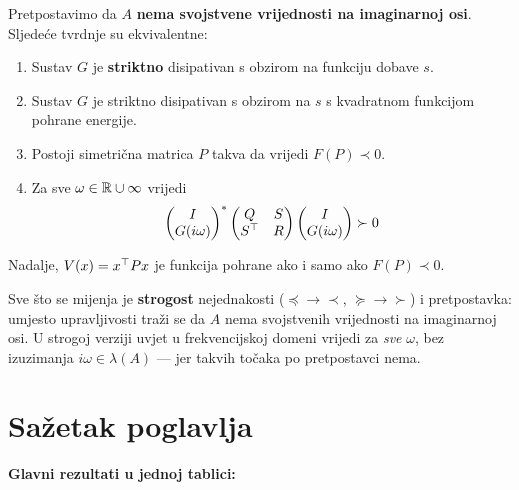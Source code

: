 \begin{teorem}
Pretpostavimo da $A$ \textbf{nema svojstvene vrijednosti na imaginarnoj osi}.
Sljedeće tvrdnje su ekvivalentne:
\begin{enumerate}[label=\roman*)]
  \item Sustav $G$ je \textbf{striktno} disipativan s obzirom na funkciju
        dobave $s$.
  \item Sustav $G$ je striktno disipativan s obzirom na $s$ s kvadratnom
        funkcijom pohrane energije.
  \item Postoji simetrična matrica $P$ takva da vrijedi $F(P) \prec 0$.
  \item Za sve $\omega \in \mathbb{R} \cup \infty$ vrijedi
        \[
        \begin{pmatrix}I\\ G(i\omega)\end{pmatrix}^{*}
        \begin{pmatrix}Q & S\\ S^{\top} & R\end{pmatrix}
        \begin{pmatrix}I\\ G(i\omega)\end{pmatrix} \succ 0
        \]
\end{enumerate}
Nadalje, $V(x) = x^{\top} Px$ je funkcija pohrane ako i samo ako $F(P) \prec 0$.
\end{teorem}

\begin{napomena}
Sve što se mijenja je \textbf{strogost} nejednakosti ($\preceq \to \prec$,
$\succeq \to \succ$) i pretpostavka: umjesto upravljivosti traži se da $A$ nema
svojstvenih vrijednosti na imaginarnoj osi. U strogoj verziji uvjet u
frekvencijskoj domeni vrijedi za \emph{sve} $\omega$, bez izuzimanja
$i\omega \in \lambda(A)$ --- jer takvih točaka po pretpostavci nema.
\end{napomena}

\section{Sažetak poglavlja}

\textbf{Glavni rezultati u jednoj tablici:}

